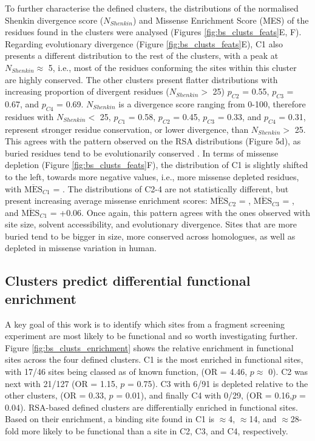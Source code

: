 To further characterise the defined clusters, the distributions of the normalised Shenkin divergence score ($N_{Shenkin}$) and Missense Enrichment Score (MES) of the residues found in the clusters were analysed (Figures \ref{fig:bs_clusts_feats}E, F). Regarding evolutionary divergence (Figure  \ref{fig:bs_clusts_feats}E), C1 also presents a different distribution to the rest of the clusters, with a peak at $N_{Shenkin} \approx$ 5, i.e., most of the residues conforming the sites within this cluster are highly conserved. The other clusters present flatter distributions with increasing proportion of divergent residues ($N_{Shenkin} >$ 25) $p_{C2}$ = 0.55, $p_{C3}$ = 0.67, and $p_{C4}$ = 0.69. $N_{Shenkin}$ is a divergence score ranging from 0-100, therefore residues with $N_{Shenkin} <$ 25, $p_{C1}$ = 0.58, $p_{C2}$ = 0.45, $p_{C3}$ = 0.33, and $p_{C4}$ = 0.31, represent stronger residue conservation, or lower divergence, than $N_{Shenkin} >$ 25. This agrees with the pattern observed on the RSA distributions (Figure 5d), as buried residues tend to be evolutionarily conserved \cite{CHOTHIA_1986_CONSERVATION, RUSSELL_1994_UNCONSERVATION}. In terms of missense depletion (Figure  \ref{fig:bs_clusts_feats}F), the distribution of C1 is slightly shifted to the left, towards more negative values, i.e., more missense depleted residues, with $\overline{\text{MES}}_{C1}$ = . The distributions of C2-4 are not statistically different, but present increasing average missense enrichment scores: $\overline{\text{MES}}_{C2}$ = , $\overline{\text{MES}}_{C3}$ = , and $\overline{\text{MES}}_{C1}$ = +0.06. Once again, this pattern agrees with the ones observed with site size, solvent accessibility, and evolutionary divergence. Sites that are more buried tend to be bigger in size, more conserved across homologues, as well as depleted in missense variation in human.

\subsection{Clusters predict differential functional enrichment}

A key goal of this work is to identify which sites from a fragment screening experiment are most likely to be functional and so worth investigating further. Figure \ref{fig:bs_clusts_enrichment} shows the relative enrichment in functional sites across the four defined clusters. C1 is the most enriched in functional sites, with 17/46 sites being classed as of known function, (OR = 4.46, $p \approx$ 0). C2 was next with 21/127 (OR = 1.15, $p$ = 0.75). C3 with 6/91 is depleted relative to the other clusters, (OR = 0.33, $p$ = 0.01), and finally C4 with 0/29, (OR = 0.16,$p$ = 0.04). RSA-based defined clusters are differentially enriched in functional sites. Based on their enrichment, a binding site found in C1 is $\approx$4, $\approx$14, and $\approx$28-fold more likely to be functional than a site in C2, C3, and C4, respectively.

